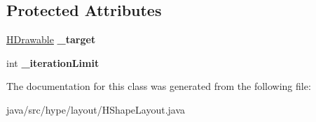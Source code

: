 \subsection*{Protected Attributes}
\begin{DoxyCompactItemize}
\item 
\hypertarget{classhype_1_1layout_1_1_h_shape_layout_a296d7f8b494e8148a1cc88565fbf39d3}{\hyperlink{classhype_1_1drawable_1_1_h_drawable}{H\-Drawable} {\bfseries \-\_\-target}}\label{classhype_1_1layout_1_1_h_shape_layout_a296d7f8b494e8148a1cc88565fbf39d3}

\item 
\hypertarget{classhype_1_1layout_1_1_h_shape_layout_acc0b801d7ea4a4f0602d4d47aaad48a1}{int {\bfseries \-\_\-iteration\-Limit}}\label{classhype_1_1layout_1_1_h_shape_layout_acc0b801d7ea4a4f0602d4d47aaad48a1}

\end{DoxyCompactItemize}


The documentation for this class was generated from the following file\-:\begin{DoxyCompactItemize}
\item 
java/src/hype/layout/H\-Shape\-Layout.\-java\end{DoxyCompactItemize}
